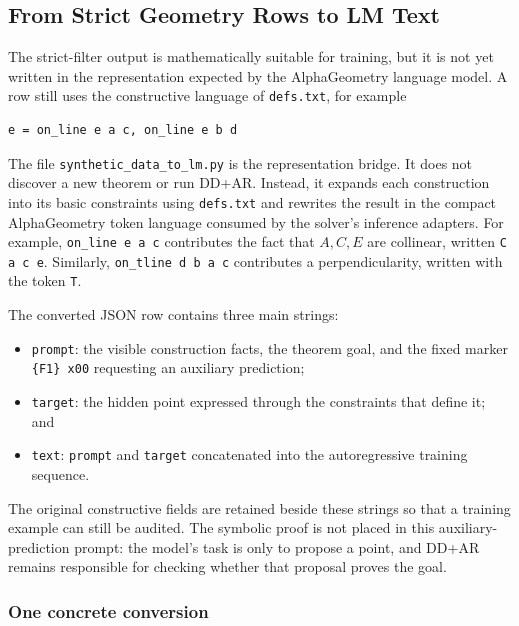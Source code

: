 \documentclass[reqno]{amsart}
\DeclareMathOperator{\1}{\textbf{1}}
\begin{document}
\subsection{From Strict Geometry Rows to LM Text}
\label{sec:lm-data-pipeline}

The strict-filter output is mathematically suitable for training, but it is
not yet written in the representation expected by the AlphaGeometry language
model.  A row still uses the constructive language of \verb|defs.txt|, for
example
\begin{lstlisting}
e = on_line e a c, on_line e b d
\end{lstlisting}
The file \verb|synthetic_data_to_lm.py| is the representation bridge.  It does
not discover a new theorem or run DD+AR.  Instead, it expands each construction
into its basic constraints using \verb|defs.txt| and rewrites the result in the
compact AlphaGeometry token language consumed by the solver's inference
adapters. For example,
\verb|on_line e a c| contributes the fact that $A,C,E$ are collinear, written
\verb|C a c e|.  Similarly, \verb|on_tline d b a c| contributes a
perpendicularity, written with the token \verb|T|.

The converted JSON row contains three main strings:
\begin{itemize}
    \item \verb|prompt|: the visible construction facts, the theorem goal, and
          the fixed marker \verb|{F1} x00| requesting an auxiliary prediction;
    \item \verb|target|: the hidden point expressed through the constraints
          that define it; and
    \item \verb|text|: \verb|prompt| and \verb|target| concatenated into the
          autoregressive training sequence.
\end{itemize}
The original constructive fields are retained beside these strings so that a
training example can still be audited.  The symbolic proof is not placed in
this auxiliary-prediction prompt: the model's task is only to propose a point,
and DD+AR remains responsible for checking whether that proposal proves the
goal.

\subsubsection{One concrete conversion}
\end{document}
